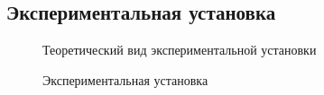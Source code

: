 \documentclass[a4paper,12pt]{article} %
\begin{document}
\subsection{Экспериментальная установка}
\begin{figure}[h!]
\caption{Теоретический вид экспериментальной установки}
\label{fig:image1}
\end{figure}
\begin{figure}[h!]
\caption{Экспериментальная установка}
\label{fig:image2}
\end{figure}
\end{document}
